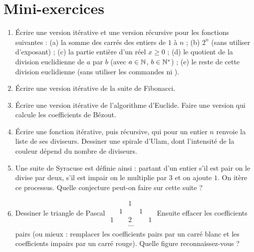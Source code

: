 \section{Mini-exercices}

\begin{frame}
\small\vspace*{-1ex}
\begin{miniexercice}
\vspace*{-1ex}
\begin{enumerate}
\setlength{\itemsep}{0pt}
  \item \'Ecrire une version itérative et une version récursive pour les fonctions suivantes : 
  (a) la somme des carrés des entiers de $1$ à $n$ ; 
  (b) $2^n$ (sans utiliser d'exposant) ;
  (c) la partie entière d'un réel $x\ge0$ ;
  (d) le quotient de la division euclidienne de $a$ par $b$ (avec $a \in \mathbb{N}$, $b \in \mathbb{N}^*$) ;
  (e) le reste de cette division euclidienne (sans utiliser les commandes \codeinline{\%} ni \codeinline{//}).
  

  \item \'Ecrire une version itérative de la suite de Fibonacci.
  
  \item \'Ecrire une version itérative de l'algorithme d'Euclide. 
  Faire une version qui calcule les coefficients de Bézout. 
  
  \item \'Ecrire une fonction itérative, puis récursive, qui pour un entier $n$ renvoie la liste de ses diviseurs.
  Dessiner une spirale d'Ulam, dont l'intensité de la couleur dépend du nombre de diviseurs.
  
  \item Une suite de Syracuse est définie ainsi : partant d'un entier s'il est pair on le divise par deux,
  s'il est impair on le multiplie par $3$ et on ajoute $1$. On itère ce processus. Quelle conjecture peut-on faire
  sur cette suite ?
  
  \item Dessiner le triangle de Pascal 
  {\tiny $\begin{smallmatrix} & & 1 & & \\  & 1 & & 1 & \\ 1 & & 2 & & 1 \\ & & \cdots & & \end{smallmatrix}$ }
  Ensuite effacer les coefficients pairs (ou mieux : remplacer les coefficients pairs 
  par un carré blanc et les coefficients impairs par un carré rouge). Quelle figure reconnaissez-vous ?
\end{enumerate}
\end{miniexercice}

\end{frame}

